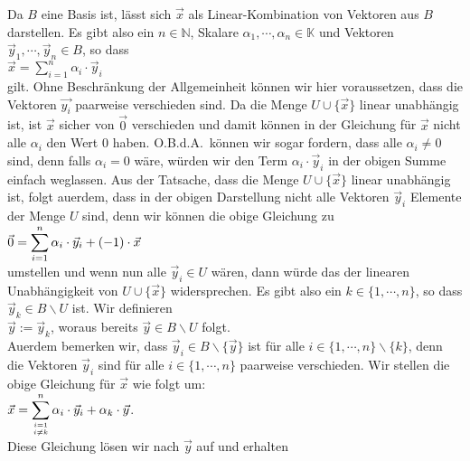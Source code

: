 \proof
Da $B$ eine Basis ist, l\"{a}sst sich $\vec{x}$ als Linear-Kombination von Vektoren aus $B$
darstellen.  Es gibt also ein $n \in \mathbb{N}$, Skalare $\alpha_1, \cdots, \alpha_n \in \mathbb{K}$ 
und Vektoren $\vec{y}_1, \cdots, \vec{y}_n\in B$, so dass 
\\[0.2cm]
\hspace*{1.3cm}
$\vec{x} = \sum\limits_{i=1}^n \alpha_i \cdot \vec{y}_i$ 
\\[0.2cm]
gilt.  Ohne Beschr\"{a}nkung der Allgemeinheit k\"{o}nnen wir hier voraussetzen, dass die Vektoren
$\vec{y_i}$ paarweise verschieden sind.  
Da die Menge $U \cup \{ \vec{x} \}$ linear unabh\"{a}ngig ist, ist $\vec{x}$ sicher von $\vec{0}$
verschieden und damit k\"{o}nnen in der Gleichung f\"{u}r $\vec{x}$ 
nicht alle $\alpha_i$ den Wert $0$ haben.  O.B.d.A.~k\"{o}nnen wir sogar fordern,
dass alle $\alpha_i \not= 0$ sind, denn falls $\alpha_i = 0$ w\"{a}re, w\"{u}rden wir den Term $\alpha_i \cdot \vec{y}_i$
in der obigen Summe einfach weglassen.
Aus der Tatsache, dass die Menge $U \cup \{ \vec{x} \}$ linear unabh\"{a}ngig ist, folgt au\3erdem, dass in der obigen Darstellung
nicht alle Vektoren $\vec{y}_i$ Elemente der Menge $U$ sind, denn wir k\"{o}nnen die obige Gleichung zu
\\[0.2cm]
\hspace*{1.3cm}
$\displaystyle\vec{0} = \sum\limits_{i=1}^n \alpha_i \cdot \vec{y}_i + (-1) \cdot \vec{x}$ 
\\[0.2cm]
umstellen und wenn nun alle $\vec{y}_i \in U$ w\"{a}ren, dann w\"{u}rde das der linearen Unabh\"{a}ngigkeit von
$U \cup \{\vec{x} \}$ widersprechen.  Es gibt also ein $k \in \{1,\cdots,n\}$, so dass $\vec{y}_k \in B \backslash U$ ist.  Wir definieren
\\[0.2cm]
\hspace*{1.3cm}
$\vec{y} := \vec{y}_k$, \quad woraus bereits $\vec{y} \in B \backslash U$ folgt.
\\[0.2cm]
Au\3erdem bemerken wir, dass $\vec{y}_i \in B \backslash \{\vec{y}\}$ ist f\"{u}r alle
$i \in \{1,\cdots,n\} \backslash \{k\}$, denn die Vektoren $\vec{y}_i$ sind f\"{u}r alle $i\in \{1,\cdots,n\}$ paarweise verschieden.
Wir stellen die obige Gleichung f\"{u}r $\vec{x}$ wie folgt um:
\\[0.2cm]
\hspace*{1.3cm}
$\displaystyle\vec{x} = \sum\limits_{i=1 \atop i \not= k}^n \alpha_i \cdot \vec{y}_i +  \alpha_k \cdot \vec{y}$.
\\[0.2cm]
Diese Gleichung l\"{o}sen wir nach $\vec{y}$ auf und erhalten
\\[0.2cm]
